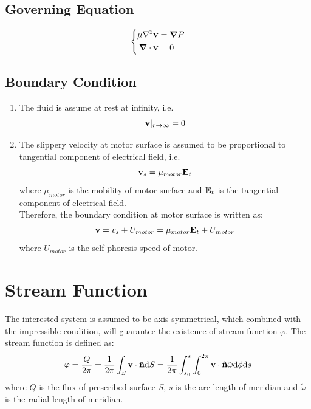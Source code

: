 \documentclass[fontsize=11pt, %
                             paper=a4, %
                             twoside, %
                             captions=tableheading,
                             index=totoc,
                             hyperref]{labbook}
\begin{document}
\begin{addmargin}[4cm]{0cm}
\subsection{Governing Equation}
\begin{equation}
\left\{
\begin{aligned}
\mu\nabla^2\mathbf{v}&=\mbox{\boldmath$ \nabla $} P\\
\mbox{\boldmath$ \nabla $} \cdot \mathbf{v}&=0
\end{aligned}
\right.
\end{equation}
\subsection{Boundary Condition}
\begin{enumerate}
\item
The fluid is assume at rest at infinity, i.e.
\begin{equation}
\mathbf{v}|_{r\rightarrow\infty}=0
\end{equation}
\item
The slippery velocity at motor surface is assumed to be proportional to tangential component of electrical field, i.e.
\begin{equation}
\mathbf{v}_s=\mu_{motor}\mathbf{E}_t
\end{equation}
where $\mu_{motor}$ is the mobility of motor surface and $\mathbf{E}_t$ is the tangential component of electrical field.\\
Therefore, the boundary condition at motor surface is written as:
\begin{equation}
\mathbf{v}=v_s+U_{motor}=\mu_{motor}\mathbf{E}_t+U_{motor}
\end{equation}
where $U_{motor}$ is the self-phoresis speed of motor.
\end{enumerate}
\section{Stream Function}
The interested system is assumed to be axis-symmetrical, which combined with the impressible condition, will guarantee the existence of stream function $\varphi$. The stream function is defined as:
\begin{equation}
\varphi=\frac{Q}{2\pi}=\frac{1}{2\pi}\int_{S}\mathbf{v}\cdot\mathbf{\hat{n}}\mathrm{d}S=\frac{1}{2\pi}\int_{s_0}^s\int_{0}^{2\pi}\mathbf{v}\cdot \mathbf{\hat{n}} \tilde{\omega}\mathrm{d}\phi\mathrm{d}s
\end{equation}
where $Q$ is the flux of prescribed surface $S$, $s$ is the arc length of meridian and $\tilde{\omega}$ is the radial length of meridian.

\end{addmargin}
\end{document}
